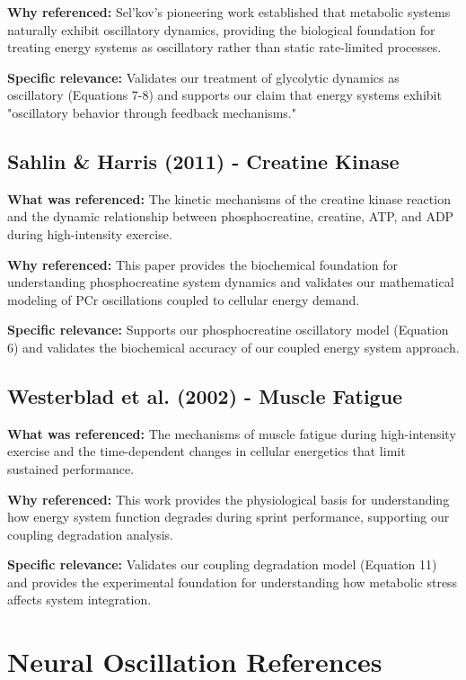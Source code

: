 \documentclass{article}
\begin{document}
\textbf{Why referenced:} Sel'kov's pioneering work established that metabolic systems naturally exhibit oscillatory dynamics, providing the biological foundation for treating energy systems as oscillatory rather than static rate-limited processes.

\textbf{Specific relevance:} Validates our treatment of glycolytic dynamics as oscillatory (Equations 7-8) and supports our claim that energy systems exhibit "oscillatory behavior through feedback mechanisms."

\subsection{Sahlin & Harris (2011) - Creatine Kinase}

\textbf{What was referenced:} The kinetic mechanisms of the creatine kinase reaction and the dynamic relationship between phosphocreatine, creatine, ATP, and ADP during high-intensity exercise.

\textbf{Why referenced:} This paper provides the biochemical foundation for understanding phosphocreatine system dynamics and validates our mathematical modeling of PCr oscillations coupled to cellular energy demand.

\textbf{Specific relevance:} Supports our phosphocreatine oscillatory model (Equation 6) and validates the biochemical accuracy of our coupled energy system approach.

\subsection{Westerblad et al. (2002) - Muscle Fatigue}

\textbf{What was referenced:} The mechanisms of muscle fatigue during high-intensity exercise and the time-dependent changes in cellular energetics that limit sustained performance.

\textbf{Why referenced:} This work provides the physiological basis for understanding how energy system function degrades during sprint performance, supporting our coupling degradation analysis.

\textbf{Specific relevance:} Validates our coupling degradation model (Equation 11) and provides the experimental foundation for understanding how metabolic stress affects system integration.

\section{Neural Oscillation References}
\end{document}
